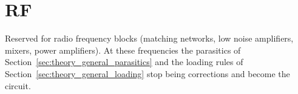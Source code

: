 \chapter{RF}\label{ch:rf}

Reserved for radio frequency blocks (matching networks, low noise
amplifiers, mixers, power amplifiers). At these frequencies the
parasitics of Section~\ref{sec:theory_general_parasitics} and the loading rules
of Section~\ref{sec:theory_general_loading} stop being corrections and become the
circuit.

